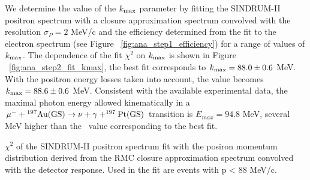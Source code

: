 We determine the value of the $\mbox{$k_{\rm max}$}$ parameter by fitting the SINDRUM-II positron spectrum
with a closure approximation spectrum convolved with the resolution $\sigma_P = 2$ MeV/c
and the efficiency determined from the fit to the electron spectrum
(see Figure ~\ref{fig:ana_step1_efficiency}) for a range of values of $\mbox{$k_{\rm max}$}$.
The dependence of the fit $\chi^2$ on $\mbox{$k_{\rm max}$}$ is shown in Figure ~\ref{fig:ana_step2_fit_kmax},
the best fit corresponds to $\mbox{$k_{\rm max}$} = 88.0 \pm 0.6$ MeV.
%
With the positron energy losses taken into account, the value becomes $\mbox{$k_{\rm max}$} = 88.6 \pm 0.6$ MeV.
Consistent with the available experimental data, the maximal photon energy allowed kinematically
in a $\rm \mu^- + \mbox{$\rm ^{197}Au$}(GS) \rightarrow \nu +\gamma + ^{197}Pt(GS) $ transition
is $E_{max} = 94.8$ MeV, several MeV higher than the \kmax\ value corresponding to the best fit.
\vspace{0.1in}
 {
  \label{fig:ana_step2_fit_kmax}
  $\chi^2$ of the SINDRUM-II positron spectrum fit with the posiron momentum distribution
  derived from the RMC closure approximation spectrum convolved with the detector response. 
  Used in the fit are events with p < 88 MeV/c.
}
\vspace{0.1in}


